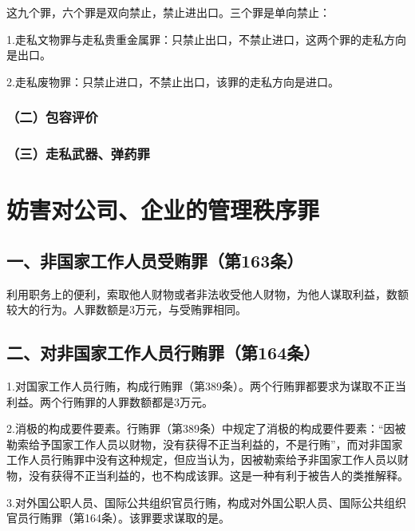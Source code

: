这九个罪，六个罪是双向禁止，禁止进出口。三个罪是单向禁止：

1.走私文物罪与走私贵重金属罪：只禁止出口，不禁止进口，这两个罪的走私方向是出口。

2.走私废物罪：只禁止进口，不禁止出口，该罪的走私方向是进口。

\subsubsection*{（二）包容评价}


\subsubsection*{（三）走私武器、弹药罪}


\section{妨害对公司、企业的管理秩序罪}

\subsection*{一、非国家工作人员受贿罪（第163条）}

利用职务上的便利，索取他人财物或者非法收受他人财物，为他人谋取利益，数额较大的行为。人罪数额是3万元，与受贿罪相同。


\subsection*{二、对非国家工作人员行贿罪（第164条）}

1.对国家工作人员行贿，构成行贿罪（第389条）。两个行贿罪都要求为谋取不正当利益。两个行贿罪的人罪数额都是3万元。

2.消极的构成要件要素。行贿罪（第389条）中规定了消极的构成要件要素：“因被勒索给予国家工作人员以财物，没有获得不正当利益的，不是行贿”，而对非国家工作人员行贿罪中没有这种规定，但应当认为，因被勒索给予非国家工作人员以财物，没有获得不正当利益的，也不构成该罪。这是一种有利于被告人的类推解释。

3.对外国公职人员、国际公共组织官员行贿，构成对外国公职人员、国际公共组织官员行贿罪（第164条）。该罪要求谋取的是。

